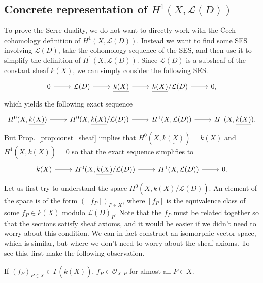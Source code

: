 \subsection{Concrete representation of $H^{1}(X,\mathcal{L}(D))$}
To prove the Serre duality, we do not want to directly work with the \v Cech
cohomology definition of $H^{1}(X,\mathcal{L}(D))$.
Instead we want to find some SES involving $\mathcal{L}(D)$,
take the cohomology sequence of the SES, and then use it to simplify
the definition of $H^{1}(X,\mathcal{L}(D))$. Since $\mathcal{L}(D)$ is
a subsheaf of the constant sheaf $\underline{k(X)}$, we can simply consider
the following SES.
\[
  \begin{tikzcd}
    0\arrow{r} & \mathcal{L}(D)\arrow{r} & \underline{k(X)}\arrow{r}
    & \underline{k(X)}/\mathcal{L}(D)\arrow{r} & 0,
  \end{tikzcd}
\]
which yields the following exact sequence
\[
  \begin{tikzcd}
    H^{0}(X,\underline{k(X)})\arrow{r} & H^{0}(X,\underline{k(X)}
    /\mathcal{L}(D))\arrow{r} & H^{1}(X,\mathcal{L}(D))\arrow{r}
    & H^{1}(X,\underline{k(X)}).
  \end{tikzcd}
\]
But Prop.~\ref{prop:const_sheaf} implies that
$H^{0}(X,\underline{k(X)})=k(X)$ and $H^{1}(X,\underline{k(X)})=0$
so that the exact sequence simplifies to
\[
  \begin{tikzcd}
    k(X)\arrow{r} & H^{0}(X,\underline{k(X)}/\mathcal{L}(D))\arrow{r}
    & H^{1}(X,\mathcal{L}(D))\arrow{r} & 0.
  \end{tikzcd}
\]
Let us first try to understand the space
$H^{0}(X,\underline{k(X)}/\mathcal{L}(D))$. An element of the space
is of the form $([f_{P}])_{P\in X}$, where $[f_{P}]$ is the equivalence
class of some $f_{P}\in k(X)$ modulo $\mathcal{L}(D)_{P}$.
Note that the $f_{P}$ must be related together so that the sections
satisfy sheaf axioms, and it would be easier if we didn't need to worry about
this condition. We can in fact construct an isomorphic vector space, which is
similar, but where we don't need to worry about the sheaf axioms. To see
this, first make the following observation.
\begin{prop}
  If $(f_{P})_{P\in X}\in \Gamma(\underline{k(X)})$,
  $f_{P}\in\mathscr{O}_{X,P}$ for almost all $P\in X$.
\end{prop}
